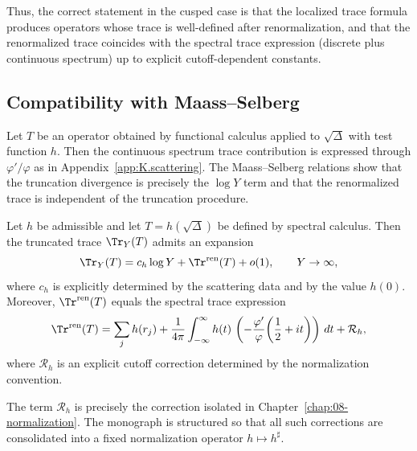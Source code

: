 Thus, the correct statement in the cusped case is that the localized trace formula produces operators whose trace is
well-defined after renormalization, and that the renormalized trace coincides with the spectral trace expression
(discrete plus continuous spectrum) up to explicit cutoff-dependent constants.

\subsection{Compatibility with Maass--Selberg}
\label{subsec:L.ms.compat}

Let $T$ be an operator obtained by functional calculus applied to $\sqrt{\Delta}$ with test function $h$.
Then the continuous spectrum trace contribution is expressed through $\varphi'/\varphi$ as in
Appendix~\ref{app:K.scattering}.
The Maass--Selberg relations show that the truncation divergence is precisely the $\log Y$ term and that the
renormalized trace is independent of the truncation procedure.

\begin{theorem}
\label{thm:L.canonical.renorm}
Let $h$ be admissible and let $T=h(\sqrt{\Delta})$ be defined by spectral calculus.
Then the truncated trace $\Tr_Y(T)$ admits an expansion
\begin{equation}\label{eq:L.renorm.expansion}
\Tr_Y(T)
=
c_h\log Y
+
\Tr^{\mathrm{ren}}(T)
+
o(1),
\qquad Y\to\infty,
\end{equation}
where $c_h$ is explicitly determined by the scattering data and by the value $h(0)$.
Moreover, $\Tr^{\mathrm{ren}}(T)$ equals the spectral trace expression
\begin{equation}\label{eq:L.spectral.renorm}
\Tr^{\mathrm{ren}}(T)
=
\sum_{j} h(r_j)
+
\frac{1}{4\pi}
\int_{-\infty}^{\infty}
h(t)\,
\left(
-\frac{\varphi'}{\varphi}\!\left(\frac12+it\right)
\right)\,dt
+
\mathcal{R}_h,
\end{equation}
where $\mathcal{R}_h$ is an explicit cutoff correction determined by the normalization convention.
\end{theorem}

\begin{remark}
\label{rem:L.renorm.interface}
The term $\mathcal{R}_h$ is precisely the correction isolated in Chapter~\ref{chap:08-normalization}.
The monograph is structured so that all such corrections are consolidated into a fixed normalization operator
$h\mapsto h^\sharp$.
\end{remark}

